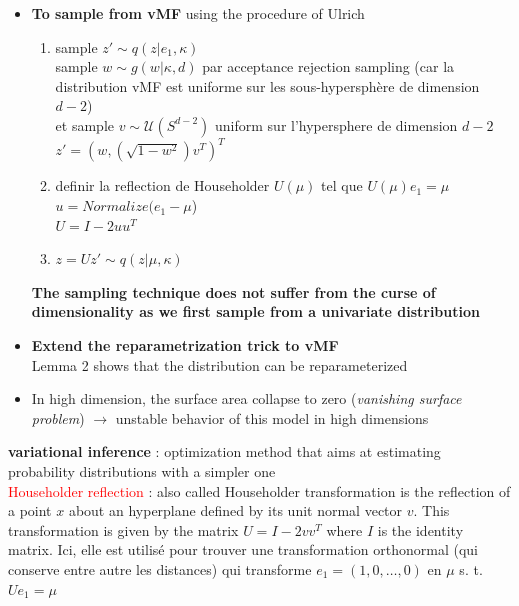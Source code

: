 \documentclass[12pt]{article}
\newcommand{\red}[1]{\textcolor{red}{#1}}
\begin{document}
\begin{itemize}
    \item \textbf{To sample from vMF} using the procedure of Ulrich \\
        \begin{enumerate}
            \item sample $z' \sim q(z| e_1, \kappa)$ \\
                 sample $w \sim g(w | \kappa, d)$ par acceptance rejection sampling (car la distribution vMF est uniforme sur les sous-hypersphère de dimension $d-2$)\\
                 et sample $v \sim \mathcal{U}(S^{d-2})$ uniform sur l'hypersphere de dimension $d-2$ \\
                 $z' = (w, (\sqrt{1 - w^2})v^T)^T$
            \item definir la reflection de Householder $U(\mu)$ tel que $U(\mu)e_1 = \mu$ \\
                $u = Normalize(e_1 - \mu$) \\
                $U = I - 2uu^T$
            \item $z = Uz' \sim q(z | \mu, \kappa)$

        \end{enumerate}

        \textbf{The sampling technique does not suffer from the curse of dimensionality as we first sample from a univariate distribution}
        
    \item \textbf{Extend the reparametrization trick to vMF}\\ 
    Lemma 2 shows that the distribution can be reparameterized
    \item In high dimension, the surface area collapse to zero (\textit{vanishing surface problem}) $\rightarrow$ unstable behavior of this model in high dimensions
\end{itemize}

\textbf{variational inference} : optimization method that aims at estimating probability distributions with a simpler one \\

\red{Householder reflection} : also called Householder transformation is the reflection of a point $x$ about an hyperplane defined by its unit normal vector $v$. This transformation is given by the matrix $U = I - 2vv^T$ where $I$ is the identity matrix. Ici, elle est utilisé pour trouver une transformation orthonormal (qui conserve entre autre les distances) qui transforme $e_1=(1, 0, \dots, 0)$ en $\mu$ s. t. $Ue_1 = \mu$\\ 
\end{document}
